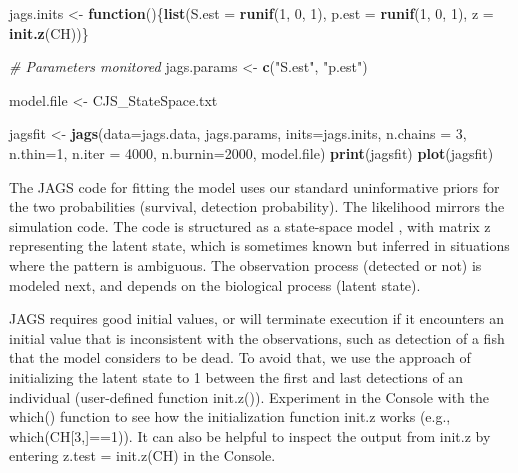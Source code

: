 \documentclass[
]{krantz}
\makeatletter
\newenvironment{Shaded}{\begin{snugshade}}{\end{snugshade}}
\newcommand{\AttributeTok}[1]{\textcolor[rgb]{0.27,0.27,0.27}{#1}}
\newcommand{\CommentTok}[1]{\textcolor[rgb]{0.37,0.37,0.37}{\textit{#1}}}
\newcommand{\ControlFlowTok}[1]{\textcolor[rgb]{0.27,0.27,0.27}{\textbf{#1}}}
\newcommand{\DecValTok}[1]{\textcolor[rgb]{0.06,0.06,0.06}{#1}}
\newcommand{\FunctionTok}[1]{\textcolor[rgb]{0.27,0.27,0.27}{\textbf{#1}}}
\newcommand{\NormalTok}[1]{#1}
\newcommand{\OtherTok}[1]{\textcolor[rgb]{0.37,0.37,0.37}{#1}}
\newcommand{\StringTok}[1]{\textcolor[rgb]{0.5,0.5,0.5}{#1}}
\newenvironment{kframe}{%
\medskip{}
\setlength{\fboxsep}{.8em}
 \def\at@end@of@kframe{}%
 \ifinner\ifhmode%
  \def\at@end@of@kframe{\end{minipage}}%
  \begin{minipage}{\columnwidth}%
 \fi\fi%
 \def\FrameCommand##1{\hskip\@totalleftmargin \hskip-\fboxsep
 \colorbox{shadecolor}{##1}\hskip-\fboxsep
     \hskip-\linewidth \hskip-\@totalleftmargin \hskip\columnwidth}%
 \MakeFramed {\advance\hsize-\width
   \@totalleftmargin\z@ \linewidth\hsize
   \@setminipage}}%
 {\par\unskip\endMakeFramed%
 \at@end@of@kframe}
\renewenvironment{Shaded}{\begin{kframe}}{\end{kframe}}
\makeatother
\begin{document}
\begin{Shaded}
\begin{Highlighting}[]
\NormalTok{jags.inits }\OtherTok{\textless{}{-}} \ControlFlowTok{function}\NormalTok{()\{}\FunctionTok{list}\NormalTok{(}\AttributeTok{S.est =} \FunctionTok{runif}\NormalTok{(}\DecValTok{1}\NormalTok{, }\DecValTok{0}\NormalTok{, }\DecValTok{1}\NormalTok{), }
                              \AttributeTok{p.est =} \FunctionTok{runif}\NormalTok{(}\DecValTok{1}\NormalTok{, }\DecValTok{0}\NormalTok{, }\DecValTok{1}\NormalTok{), }\AttributeTok{z =} \FunctionTok{init.z}\NormalTok{(CH))\}}

\CommentTok{\# Parameters monitored}
\NormalTok{jags.params }\OtherTok{\textless{}{-}} \FunctionTok{c}\NormalTok{(}\StringTok{"S.est"}\NormalTok{, }\StringTok{"p.est"}\NormalTok{)}

\NormalTok{model.file }\OtherTok{\textless{}{-}} \StringTok{\textquotesingle{}CJS\_StateSpace.txt\textquotesingle{}}

\NormalTok{jagsfit }\OtherTok{\textless{}{-}} \FunctionTok{jags}\NormalTok{(}\AttributeTok{data=}\NormalTok{jags.data, jags.params, }\AttributeTok{inits=}\NormalTok{jags.inits,}
                \AttributeTok{n.chains =} \DecValTok{3}\NormalTok{, }\AttributeTok{n.thin=}\DecValTok{1}\NormalTok{, }\AttributeTok{n.iter =} \DecValTok{4000}\NormalTok{, }\AttributeTok{n.burnin=}\DecValTok{2000}\NormalTok{,}
\NormalTok{                model.file)}
\FunctionTok{print}\NormalTok{(jagsfit)}
\FunctionTok{plot}\NormalTok{(jagsfit)}
\end{Highlighting}
\end{Shaded}

The JAGS code for fitting the model uses our standard uninformative priors for the two probabilities (survival, detection probability). The likelihood mirrors the simulation code. The code is structured as a state-space model \citep{kéry.schaub_2012}, with matrix z representing the latent state, which is sometimes known but inferred in situations where the pattern is ambiguous. The observation process (detected or not) is modeled next, and depends on the biological process (latent state).

JAGS requires good initial values, or will terminate execution if it encounters an initial value that is inconsistent with the observations, such as detection of a fish that the model considers to be dead. To avoid that, we use the \citet{kéry.schaub_2012} approach of initializing the latent state to 1 between the first and last detections of an individual (user-defined function init.z()). Experiment in the Console with the which() function to see how the initialization function init.z works (e.g., which(CH{[}3,{]}==1)). It can also be helpful to inspect the output from init.z by entering z.test = init.z(CH) in the Console.
\end{document}
